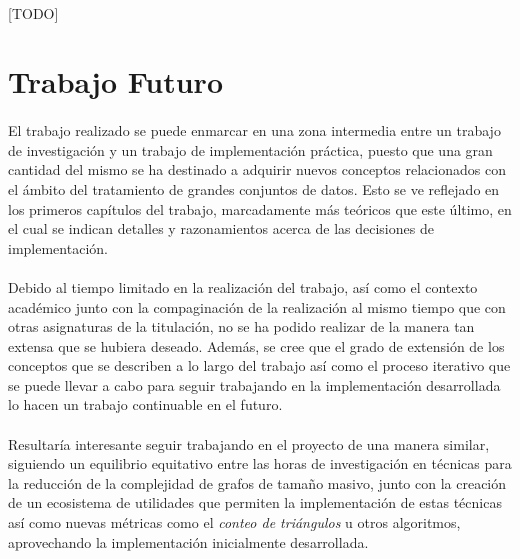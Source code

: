 \documentclass{subfiles}
\begin{document}
      \paragraph{}
      [TODO]

    \section{Trabajo Futuro}
    \label{sec:future_work}

      \paragraph{}
      El trabajo realizado se puede enmarcar en una zona intermedia entre un trabajo de investigación y un trabajo de implementación práctica, puesto que una gran cantidad del mismo se ha destinado a adquirir nuevos conceptos relacionados con el ámbito del tratamiento de grandes conjuntos de datos. Esto se ve reflejado en los primeros capítulos del trabajo, marcadamente más teóricos que este último, en el cual se indican detalles y razonamientos acerca de las decisiones de implementación.

      \paragraph{}
      Debido al tiempo limitado en la realización del trabajo, así como el contexto académico junto con la compaginación de la realización al mismo tiempo que con otras asignaturas de la titulación, no se ha podido realizar de la manera tan extensa que se hubiera deseado. Además, se cree que el grado de extensión de los conceptos que se describen a lo largo del trabajo así como el proceso iterativo que se puede llevar a cabo para seguir trabajando en la implementación desarrollada lo hacen un trabajo continuable en el futuro.

      \paragraph{}
      Resultaría interesante seguir trabajando en el proyecto de una manera similar, siguiendo un equilibrio equitativo entre las horas de investigación en técnicas para la reducción de la complejidad de grafos de tamaño masivo, junto con la creación de un ecosistema de utilidades que permiten la implementación de estas técnicas así como nuevas métricas como el \emph{conteo de triángulos} u otros algoritmos, aprovechando la implementación inicialmente desarrollada.
\end{document}
